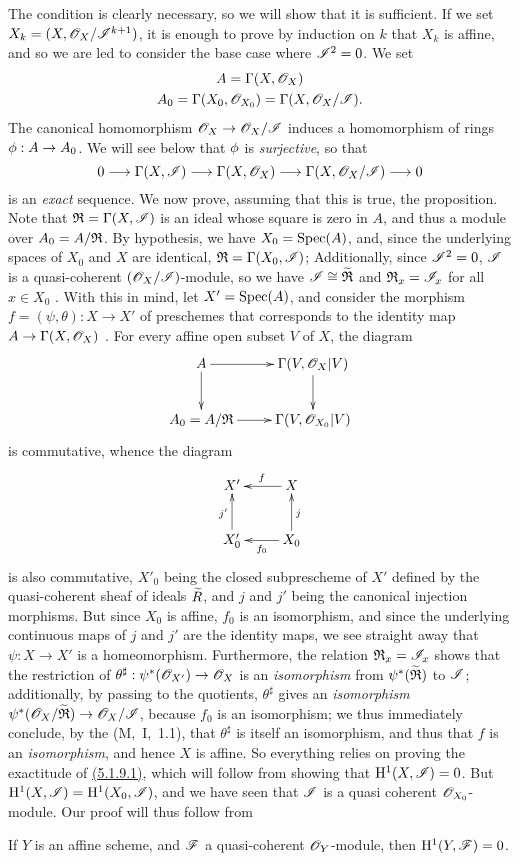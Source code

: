 The condition is clearly necessary, so we will show that it is sufficient.
If we set $X_k=(X,\mathscr{O}_X/\mathscr{I}^{k+1})$, it is enough to prove by induction on $k$ that $X_k$ is affine, and so we are led to consider the base case where $\mathscr{I}^2=0$.
We set
\begin{gather*}
    A = \Gamma(X,\mathscr{O}_X)\\
    A_0 = \Gamma(X_0,\mathscr{O}_{X_0})=\Gamma(X,\mathscr{O}_X/\mathscr{I}).
\end{gather*}
The canonical homomorphism $\OO_X\to\OO_X/\sh{I}$ induces a homomorphism of rings $\vphi:A\to A_0$.
We will see below that $\phi$ is \emph{surjective}, so that
\begin{equation*}
    0 \to \Gamma(X,\sh{I}) \to \Gamma(X,\OO_X) \to \Gamma(X,\OO_X/\sh{I}) \to 0
\end{equation*}
is an \emph{exact} sequence.
We now prove, assuming that this is true, the proposition.
Note that $\mathfrak{R}=\Gamma(X,\mathscr{I})$ is an ideal whose square is zero in $A$, and thus a module over $A_0=A/\mathfrak{R}$.
By hypothesis, we have $X_0={\mathop{\mathrm{Spec}}\nolimits}(A)$, and, since the underlying spaces of $X_0$ and $X$ are identical, $\mathfrak{R}=\Gamma(X_0,\mathscr{I})$;
Additionally, since $\mathscr{I}^2=0$, $\mathscr{I}$ is a quasi-coherent $(\mathscr{O}_X/\mathscr{I})$-module, so we have $\mathscr{I}\cong\widetilde{\mathfrak{R}}$ and $\mathfrak{R}_x=\mathscr{I}_x$ for all $x\in X_0$ .
With this in mind, let $X'={\mathop{\mathrm{Spec}}\nolimits}(A)$, and consider the morphism $f=(\psi,\theta):X\to X'$ of preschemes that corresponds to the identity map $A\to\Gamma(X,\OO_X)$ .
For every affine open subset $V$ of $X$, the diagram
\[
  \xymatrix{
    A \ar[r] \ar[d]
    & \Gamma(V,\OO_X|V) \ar[d]\\
    A_0=A/\fk{R} \ar[r]
    & \Gamma(V,\OO_{X_0}|V)
  }
\]
is commutative, whence the diagram
\[
  \xymatrix{
    X'
    & X \ar[l]_f\\
    X'_0 \ar[u]^{j'}
    & X_0 \ar[l]^{f_0} \ar[u]_j
  }
\]
is also commutative, $X'_0$ being the closed subprescheme of $X'$ defined by the quasi-coherent sheaf of ideals $\widetilde{R}$, and $j$ and $j'$ being the canonical injection morphisms.
But since $X_0$ is affine, $f_0$ is an isomorphism, and since the underlying continuous maps of $j$ and $j'$ are the identity maps, we see straight away that $\psi:X\to X'$ is a homeomorphism.
Furthermore, the relation $\mathfrak{R}_x=\mathscr{I}_x$ shows that the restriction of $\theta^\sharp:\psi^*(\OO_{X'})\to\OO_X$ is an \emph{isomorphism} from $\psi^*(\widetilde{\mathfrak{R}})$ to $\mathscr{I}$;
additionally, by passing to the quotients, $\theta^\sharp$ gives an \emph{isomorphism} $\psi^*(\OO_X/\wt{\fk{R}})\to\OO_X/\sh{I}$, because $f_0$ is an isomorphism;
we thus immediately conclude, by the  (M,~I,~1.1), that $\theta^\sharp$ is itself an isomorphism, and thus that $f$ is an \emph{isomorphism}, and hence $X$ is affine.
So everything relies on proving the exactitude of \hyperref[1.5.1.9]{(5.1.9.1)}, which will follow from showing that $\mathrm{H}^1(X,\mathscr{I})=0$.
But $\mathrm{H}^1(X,\mathscr{I})=\mathrm{H}^1(X_0,\mathscr{I})$, and we have seen that $\mathscr{I}$ is a quasi coherent $\mathscr{O}_{X_0}$-module.
Our proof will thus follow from
\begin{lem}[5.1.9.2]
\label{1.5.1.9.2}
If $Y$ is an affine scheme, and $\mathscr{F}$ a quasi-coherent $\mathscr{O}_Y$-module, then $\mathrm{H}^1(Y,\mathscr{F})=0$.
\end{lem}

